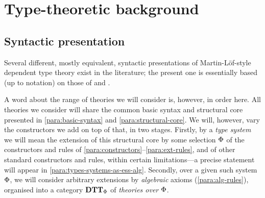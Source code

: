 

\section{Type-theoretic background}


\subsection*{Syntactic presentation}

\begin{para}Several different, mostly equivalent, syntactic presentations of Martin-Löf-style dependent type theory exist in the literature; the present one is essentially based (up to notation) on those of \cite{pitts:categorial-logic} and \cite{hofmann:syntax-and-semantics}.

A word about the range of theories we will consider is, however, in order here.  All theories we consider will share the common basic syntax and structural core presented in \ref{para:basic-syntax} and \ref{para:structural-core}.  We will, however, vary the constructors we add on top of that, in two stages.  Firstly, by a \emph{type system} we will mean the extension of this structural core by some selection ${\Phi}$ of the constructors and rules of \ref{para:constructors}--\ref{para:ext-rules}, and of other standard constructors and rules, within certain limitations---a precise statement will appear in \ref{para:types-systems-as-ess-alg}.  Secondly, over a given such system ${\Phi}$, we will consider arbitrary extensions by \emph{algebraic} axioms (\ref{para:alg-rules}), organised into a category $\mathbf{DTT}_{\Phi}$ of \emph{theories over ${\Phi}$}.
\end{para}

